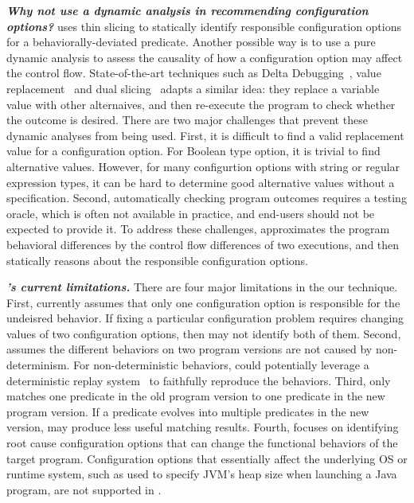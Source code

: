\vspace{1mm}
\noindent \textbf{\textit{Why not use a dynamic analysis in recommending
configuration options?}}
\ourtool uses thin slicing to statically identify responsible configuration
options for a behaviorally-deviated predicate. Another possible way is to use a pure
dynamic analysis to assess the causality of how a configuration option
may affect the control flow. State-of-the-art
techniques such as Delta Debugging~\cite{}, value replacement~\cite{} and dual slicing~\cite{}
adapts a similar idea: they replace a variable value with other alternaives,
and then re-execute the program to check whether the outcome is desired.
There are two major challenges that prevent these dynamic analyses
from being used. First, it is
difficult to find a valid replacement value for a configuration option.
For Boolean type option, it is trivial to find alternative values.
However, for many configurtion options with string or regular expression types, it
can be hard to determine good alternative values without a specification.
Second, automatically checking program outcomes requires
a testing oracle, which is often not available in practice, and end-users
should not be  expected to provide it. To address these challenges,
\ourtool approximates the program behavioral differences by the
control flow differences of two executions, and then statically reasons
about the responsible configuration options.



\vspace{1mm}
\noindent \textbf{\textit{\ourtool's current limitations.}}
There are four major limitations in the our \ourtool technique.
First, \ourtool currently assumes that only one
configuration option is responsible for the undeisred behavior.
If fixing a particular configuration problem
requires changing values of two configuration options,
then \ourtool may not identify both of them.
Second, \ourtool assumes the different behaviors
on two program versions are not caused by non-determinism.
For non-deterministic behaviors, \ourtool
could potentially leverage a deterministic replay
system~\cite{Huang:2013:CRL, Jin:2012:BRF} to faithfully reproduce the behaviors.
Third, \ourtool only matches one predicate in the old
program version to one predicate in the new program version.
If a predicate evolves into multiple predicates in the new
version, \ourtool may produce less useful matching results. 
Fourth, \ourtool focuses on identifying root cause
configuration options that can change the functional behaviors of
the target program.
Configuration options that essentially affect the underlying
OS or runtime system, such as  used to
specify JVM's heap size when launching a Java program,
are not supported in \ourtool.
